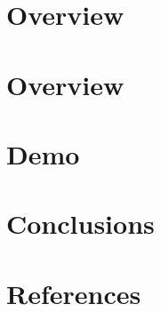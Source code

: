\section[Overview]{Overview}


% 

% 

% 

\section[Overview]{Overview}


\section[Demo]{Demo}


\section[Concl]{Conclusions}


% 

\section[Refs]{References}
